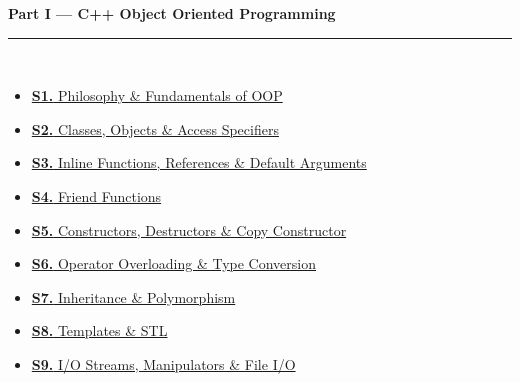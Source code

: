 \documentclass[12pt,a3paper]{article}
\begin{document}
\begin{tcolorbox}[colback=cA!5,colframe=cA,boxrule=1pt,arc=5pt,
  left=8pt,right=8pt,top=8pt,bottom=8pt,before skip=4pt]
  {\large\bfseries\textcolor{cA}{Part I --- C++ Object Oriented Programming}}\\[5pt]
  \textcolor{cA!40}{\rule{\textwidth}{0.4pt}}\\[3pt]
  \small\begin{itemize}[leftmargin=1.2em,itemsep=1pt,label={\textcolor{cA}{$\triangleright$}}]
    \item \hyperref[sec:S1]{\textbf{S1.} Philosophy \& Fundamentals of OOP}
    \item \hyperref[sec:S2]{\textbf{S2.} Classes, Objects \& Access Specifiers}
    \item \hyperref[sec:S3]{\textbf{S3.} Inline Functions, References \& Default Arguments}
    \item \hyperref[sec:S4]{\textbf{S4.} Friend Functions }
    \item \hyperref[sec:S5]{\textbf{S5.} Constructors, Destructors \& Copy Constructor}
    \item \hyperref[sec:S6]{\textbf{S6.} Operator Overloading \& Type Conversion}
    \item \hyperref[sec:S7]{\textbf{S7.} Inheritance \& Polymorphism}
    \item \hyperref[sec:S8]{\textbf{S8.} Templates \& STL}
    \item \hyperref[sec:S9]{\textbf{S9.} I/O Streams, Manipulators \& File I/O}
  \end{itemize}
\end{tcolorbox}
\end{document}
